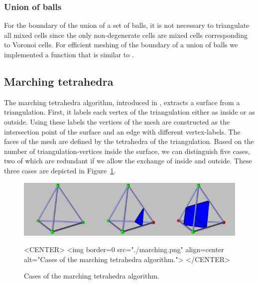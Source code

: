 \subsubsection{Union of balls}
For the boundary of the union of a set of balls, it is not necessary
to triangulate all mixed cells since the only non-degenerate cells are
mixed cells corresponding to Voronoi cells. For efficient meshing of
the boundary of a union of balls we implemented a function
 that is similar to
.



\subsection{Marching tetrahedra}
The marching tetrahedra algorithm, introduced in
\cite{cgal:tpg-rmtiise-99}, extracts a surface from a triangulation.
First, it labels each vertex of the triangulation either as inside or
as outside. Using these labels the vertices of the mesh are
constructed as the intersection point of the surface and an edge with
different vertex-labels. The faces of the mesh are defined by the
tetrahedra of the triangulation. Based on the number of
triangulation-vertices inside the surface, we can distinguish five
cases, two of which are redundant if we allow the exchange of inside
and outside. These three cases are depicted in
Figure~\ref{SkinSurface3-fig-marching}.

\begin{figure}
\begin{ccTexOnly}
\begin{center}
\includegraphics[width=\textwidth]{Skin_surface_3/marching}
\end{center}
\end{ccTexOnly}
\begin{ccHtmlOnly}
<CENTER>
<img border=0 src="./marching.png" align=center
alt="Cases of the marching tetrahedra algorithm.">
</CENTER>
\end{ccHtmlOnly}

\caption{\label{SkinSurface3-fig-marching} Cases of the marching
  tetrahedra algorithm.}
\end{figure}

